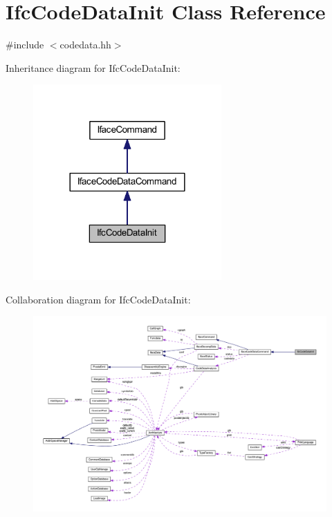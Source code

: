 \hypertarget{class_ifc_code_data_init}{}\section{Ifc\+Code\+Data\+Init Class Reference}
\label{class_ifc_code_data_init}


{\ttfamily \#include $<$codedata.\+hh$>$}



Inheritance diagram for Ifc\+Code\+Data\+Init\+:
\nopagebreak
\begin{figure}[H]
\begin{center}
\leavevmode
\includegraphics[width=204pt]{class_ifc_code_data_init__inherit__graph}
\end{center}
\end{figure}


Collaboration diagram for Ifc\+Code\+Data\+Init\+:
\nopagebreak
\begin{figure}[H]
\begin{center}
\leavevmode
\includegraphics[width=350pt]{class_ifc_code_data_init__coll__graph}
\end{center}
\end{figure}
